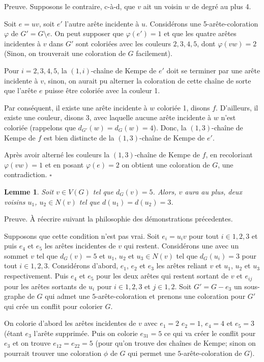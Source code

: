 \documentclass[10pt,a4paper]{article}
\newtheorem{lemme}{Lemme}
\newcommand{\ep}{{\hfill $\square$}}
\begin{document}
Preuve. 
Supposons le contraire, c-à-d, que $v$ ait un voisin $w$ de degré au plus 4.

Soit $e=uv$, soit $e'$ l'autre arête incidente à $u$.
Considérons une 5-arête-coloration $\varphi$ de $G'=G \setminus e$. On peut supposer que $\varphi(e')=1$ et que les quatre arêtes incidentes à $v$ dans $G'$ sont coloriées avec les couleurs $2,3,4,5$, dont $\varphi(vw)=2$ (Sinon, on trouverait une coloration de $G$ facilement).

Pour $i=2,3,4,5$, la $(1,i)$-chaîne de Kempe de $e'$ doit se terminer par une arête incidente à $v$, sinon, on aurait pu alterner la coloration de cette chaîne de sorte que l'arête $e$ puisse être coloriée avec la couleur 1. 

Par conséquent, il existe une arête incidente à $w$ coloriée 1, disons $f$. D'ailleurs, il existe une couleur, disons 3, avec laquelle aucune arête incidente à $w$ n'est coloriée (rappelons que $d_{G'}(w)=d_G(w)=4$). Donc, la $(1,3)$-chaîne de Kempe de $f$ est bien distincte de la $(1,3)$-chaîne de Kempe de $e'$.

Après avoir alterné les couleurs la $(1,3)$-chaîne de Kempe de $f$, en recoloriant $\varphi(vw)=1$ et en posant $\varphi(e)=2$ on obtient une coloration de $G$, une contradiction. \ep

\begin{lemme}
Soit $v \in V(G)$ tel que $d_G(v) = 5$. Alors, $v$ aura au plus, deux voisins $u_1$, $u_2 \in N(v)$ tel que $d(u_1) = d(u_2) = 3$.
\label{le:5333}
\end{lemme}


Preuve.
{\color{blue} À réecrire suivant la philosophie des démonstrations précedentes.}

Supposons que cette condition n'est pas vrai. Soit $e_i = u_iv$ pour tout $i \in {1,2,3}$ et puis $e_4$ et $e_5$ les arêtes incidentes de $v$ qui restent. Considérons une  avec un sommet $v$ tel que $d_G(v) = 5$ et $u_1$, $u_2$ et $u_3 \in N(v)$ tel que $d_G(u_i) = 3$ pour tout $i \in {1,2,3}$. Considérons d'abord, $e_1$, $e_2$ et $e_3$ les arêtes reliant $v$ et $u_1$, $u_2$ et $u_3$ respectivement. Puis $e_4$ et $e_5$ pour les deux arêtes qui restent sortant de $v$ et $e_{ij}$ pour les arêtes sortants de $u_i$ pour $i \in {1,2,3}$ et $ j \in {1,2}$. Soit $G' = G- e_3$ un sous-graphe de $G$ qui admet une $5$-arête-coloration et prenons une coloration pour $G'$ qui crée un conflit pour colorier $G$. 

On colorie d'abord les arêtes incidentes de $v$ avec $e_1 = 2$ $e_2 = 1$, $e_4 = 4$ et $e_5 = 3$ (étant $e_3$ l'arête supprimée. Puis on colorie $e_{31} = 5$ ce qui va créer le conflit pour $e_3$ et on trouve $e_{12} = e_{22} = 5$ (pour qu'on trouve des chaînes de Kempe; sinon on pourrait trouver une coloration $\phi$ de $G$ qui permet une $5$-arête-coloration de $G$). 
\end{document}
